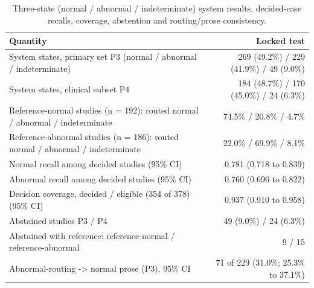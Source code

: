 \begin{table}[t]
\centering
\scriptsize
\begin{tabular}{lr}
\hline
Quantity & Locked test \\
\hline
System states, primary set P3 (normal / abnormal / indeterminate) & 269 (49.2\%) / 229 (41.9\%) / 49 (9.0\%) \\
System states, clinical subset P4 & 184 (48.7\%) / 170 (45.0\%) / 24 (6.3\%) \\
Reference-normal studies (n = 192): routed normal / abnormal / indeterminate & 74.5\% / 20.8\% / 4.7\% \\
Reference-abnormal studies (n = 186): routed normal / abnormal / indeterminate & 22.0\% / 69.9\% / 8.1\% \\
Normal recall among decided studies (95\% CI) & 0.781 (0.718 to 0.839) \\
Abnormal recall among decided studies (95\% CI) & 0.760 (0.696 to 0.822) \\
Decision coverage, decided / eligible (354 of 378) (95\% CI) & 0.937 (0.910 to 0.958) \\
Abstained studies P3 / P4 & 49 (9.0\%) / 24 (6.3\%) \\
Abstained with reference: reference-normal / reference-abnormal & 9 / 15 \\
Abnormal-routing -> normal prose (P3), 95\% CI & 71 of 229 (31.0\%; 25.3\% to 37.1\%) \\
\hline
\end{tabular}
\caption{Three-state (normal / abnormal / indeterminate) system results, decided-case recalls, coverage, abstention and routing/prose consistency.}
\label{tab:table6_three_state_system_metrics}
\end{table}
